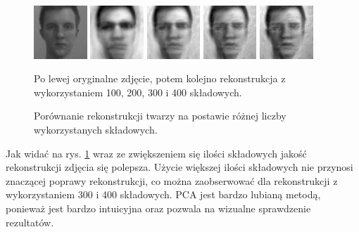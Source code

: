 \documentclass[oneside, eng]{mgr}
\begin{document}
\begin{figure}
\centering
	\parbox{2cm}{
		\includegraphics[width=2cm]{face_1.jpg}
		}
		\qquad
		\begin{minipage}{2cm}
			\includegraphics[width=2cm]{100.jpg}
		\end{minipage}
		\begin{minipage}{2cm}
			\includegraphics[width=2cm]{200.jpg}
		\end{minipage}
		\begin{minipage}{2cm}
			\includegraphics[width=2cm]{300.jpg}
		\end{minipage}
		\begin{minipage}{2cm}
			\includegraphics[width=2cm]{400.jpg}
		\end{minipage}
	\caption{Porównanie rekonstrukcji twarzy na postawie różnej liczby wykorzystanych składowych.} 
	Po lewej oryginalne zdjęcie, potem kolejno rekonstrukcja z wykorzystaniem 100, 200, 300 i 400 składowych.
	\label{fig:rekonstrukcja}
\end{figure}

Jak widać na rys. \ref{fig:rekonstrukcja} wraz ze zwiększeniem się ilości składowych jakość rekonstrukcji zdjęcia się polepsza. Użycie większej ilości składowych nie przynosi znaczącej poprawy rekonstrukcji, co można zaobserwować dla rekonstrukcji z wykorzystaniem 300 i 400 składowych. PCA jest bardzo lubianą metodą, ponieważ jest bardzo intuicyjna oraz pozwala na wizualne sprawdzenie rezultatów.
\end{document}

